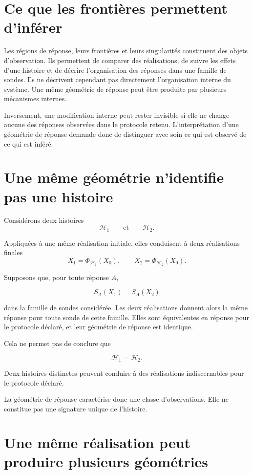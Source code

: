 \section{Ce que les frontières permettent d'inférer}\label{t3-inference-frontieres}

Les régions de réponse, leurs frontières et leurs singularités
constituent des objets d'observation. Ils permettent de comparer des réalisations, de suivre les effets d'une histoire et de décrire l'organisation des réponses dans une famille de sondes. Ils ne décrivent cependant pas directement l'organisation interne du système. Une même géométrie de réponse peut être produite par plusieurs mécanismes internes.

Inversement, une modification interne peut rester invisible si elle ne change aucune des réponses observées dans le protocole retenu. L'interprétation d'une géométrie de réponse demande donc de distinguer avec soin ce qui est observé de ce qui est inféré.

\section{Une même géométrie n'identifie pas une histoire}
\label{t3-geometrie-n-identifie-pas-histoire}

Considérons deux histoires
\[
\mathcal H_1
\qquad\text{et}\qquad
\mathcal H_2.
\]

Appliquées à une même réalisation initiale, elles conduisent à deux
réalisations finales
\[
X_1
=
\Phi_{\mathcal H_1}(X_0),
\qquad
X_2
=
\Phi_{\mathcal H_2}(X_0).
\]

Supposons que, pour toute réponse \(A\),

\[
S_A(X_1)=S_A(X_2)
\]

dans la famille de sondes considérée. Les deux réalisations donnent alors la même réponse pour toute sonde de cette famille. Elles sont équivalentes en réponse pour le protocole déclaré, et leur géométrie de réponse est identique.

Cela ne permet pas de conclure que

\[
\mathcal H_1=\mathcal H_2.
\]

Deux histoires distinctes peuvent conduire à des réalisations indiscernables pour le protocole déclaré.

La géométrie de réponse caractérise donc une classe d'observations. Elle ne constitue pas une signature unique de l'histoire.

\section{Une même réalisation peut produire plusieurs géométries}
\label{t3-meme-histoire-plusieurs-geometries}

